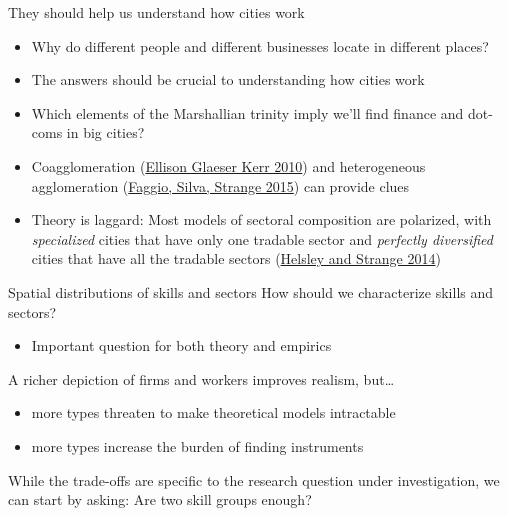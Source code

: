 \documentclass[10pt,notes=hide]{beamer}
\begin{document}
\begin{frame}{They should help us understand how cities work}
\begin{itemize}
	\item Why do different people and different businesses locate in different places?
	\item The answers should be crucial to understanding how cities work
	\item Which elements of the Marshallian trinity imply we'll find finance and dot-coms in big cities?
	\item Coagglomeration (\href{https://www.aeaweb.org/articles.php?doi=10.1257/aer.100.3.1195}{Ellison Glaeser Kerr 2010}) and heterogeneous agglomeration (\href{https://ideas.repec.org/p/ehl/lserod/58426.html}{Faggio, Silva, Strange 2015}) can provide clues
	\item Theory is laggard: Most models of sectoral composition are polarized, with \emph{specialized} cities that have only one tradable sector and \emph{perfectly diversified} cities that have all the tradable sectors (\href{http://www.jstor.org/stable/10.1086/676557}{Helsley and Strange 2014})

\end{itemize}
\end{frame}
\begin{frame}{Spatial distributions of skills and sectors}
How should we characterize skills and sectors?
\begin{itemize}
	\item Important question for both theory and empirics
\end{itemize}
A richer depiction of firms and workers improves realism, but\dots
\begin{itemize}
	\item more types threaten to make theoretical models intractable
	\item more types increase the burden of finding instruments
\end{itemize}
While the trade-offs are specific to the research question under investigation, we can start by asking: Are two skill groups enough?
\end{frame}
\end{document}
